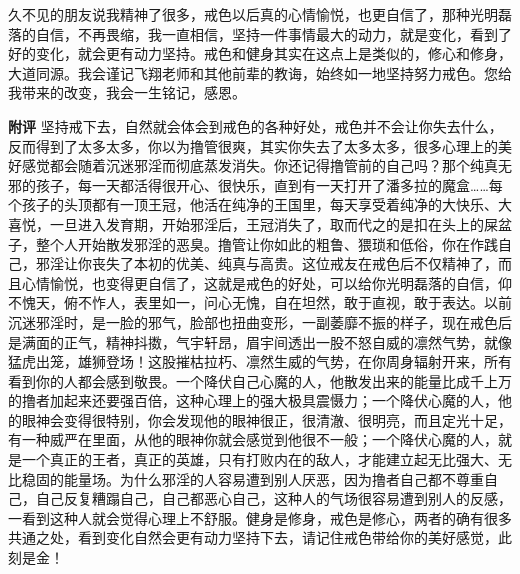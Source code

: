 \begin{case}
    久不见的朋友说我精神了很多，戒色以后真的心情愉悦，也更自信了，那种光明磊落的自信，不再畏缩，我一直相信，坚持一件事情最大的动力，就是变化，看到了好的变化，就会更有动力坚持。戒色和健身其实在这点上是类似的，修心和修身，大道同源。我会谨记飞翔老师和其他前辈的教诲，始终如一地坚持努力戒色。您给我带来的改变，我会一生铭记，感恩。

    \textbf{附评} 坚持戒下去，自然就会体会到戒色的各种好处，戒色并不会让你失去什么，反而得到了太多太多，你以为撸管很爽，其实你失去了太多太多，很多心理上的美好感觉都会随着沉迷邪淫而彻底蒸发消失。你还记得撸管前的自己吗？那个纯真无邪的孩子，每一天都活得很开心、很快乐，直到有一天打开了潘多拉的魔盒……每个孩子的头顶都有一顶王冠，他活在纯净的王国里，每天享受着纯净的大快乐、大喜悦，一旦进入发育期，开始邪淫后，王冠消失了，取而代之的是扣在头上的屎盆子，整个人开始散发邪淫的恶臭。撸管让你如此的粗鲁、猥琐和低俗，你在作践自己，邪淫让你丧失了本初的优美、纯真与高贵。这位戒友在戒色后不仅精神了，而且心情愉悦，也变得更自信了，这就是戒色的好处，可以给你光明磊落的自信，仰不愧天，俯不怍人，表里如一，问心无愧，自在坦然，敢于直视，敢于表达。以前沉迷邪淫时，是一脸的邪气，脸部也扭曲变形，一副萎靡不振的样子，现在戒色后是满面的正气，精神抖擞，气宇轩昂，眉宇间透出一股不怒自威的凛然气势，就像猛虎出笼，雄狮登场！这股摧枯拉朽、凛然生威的气势，在你周身辐射开来，所有看到你的人都会感到敬畏。一个降伏自己心魔的人，他散发出来的能量比成千上万的撸者加起来还要强百倍，这种心理上的强大极具震慑力；一个降伏心魔的人，他的眼神会变得很特别，你会发现他的眼神很正，很清澈、很明亮，而且定光十足，有一种威严在里面，从他的眼神你就会感觉到他很不一般；一个降伏心魔的人，就是一个真正的王者，真正的英雄，只有打败内在的敌人，才能建立起无比强大、无比稳固的能量场。为什么邪淫的人容易遭到别人厌恶，因为撸者自己都不尊重自己，自己反复糟蹋自己，自己都恶心自己，这种人的气场很容易遭到别人的反感，一看到这种人就会觉得心理上不舒服。健身是修身，戒色是修心，两者的确有很多共通之处，看到变化自然会更有动力坚持下去，请记住戒色带给你的美好感觉，此刻是金！
\end{case}

